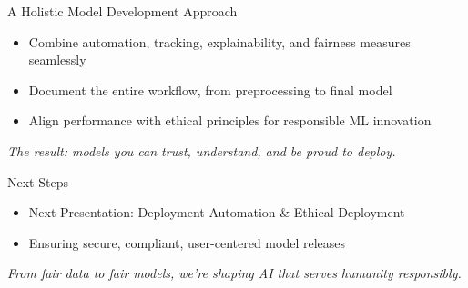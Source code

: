 \documentclass[aspectratio=169]{beamer}
\begin{document}
%
%
\begin{frame}{A Holistic Model Development Approach}
\begin{itemize}
\item Combine automation, tracking, explainability, and fairness measures seamlessly
\item Document the entire workflow, from preprocessing to final model
\item Align performance with ethical principles for responsible ML innovation
\end{itemize}

\vspace{0.8em}
\emph{The result: models you can trust, understand, and be proud to deploy.}
\end{frame}

%
%
\begin{frame}{Next Steps}
\begin{itemize}
\item Next Presentation: Deployment Automation \& Ethical Deployment
\item Ensuring secure, compliant, user-centered model releases
\end{itemize}

\vspace{0.8em}
\emph{From fair data to fair models, we’re shaping AI that serves humanity responsibly.}
\end{frame}
\end{document}

